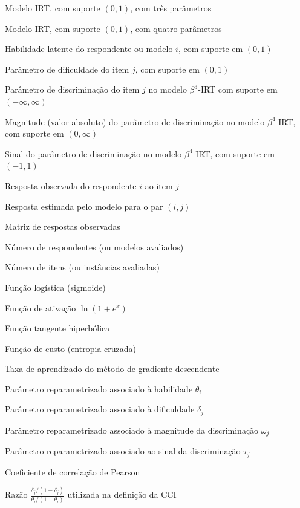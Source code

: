 \begin{simbolos}
  \item[$\beta^{3}$-IRT] Modelo IRT, com suporte $(0, 1)$, com três parâmetros
  \item[$\beta^{4}$-IRT] Modelo IRT, com suporte $(0, 1)$, com quatro parâmetros
  
  \item[$\theta_i$] Habilidade latente do respondente ou modelo $i$, com suporte em $(0,1)$
  \item[$\delta_j$] Parâmetro de dificuldade do item $j$, com suporte em $(0,1)$
  \item[$a_j$] Parâmetro de discriminação do item $j$ no modelo $\beta^3$-\gls{IRT} com suporte em $(-\infty, \infty)$
  \item[$\omega_j$] Magnitude (valor absoluto) do parâmetro de discriminação no modelo $\beta^4$-\gls{IRT}, com suporte em $(0,\infty)$
  \item[$\tau_j$] Sinal do parâmetro de discriminação no modelo $\beta^4$-\gls{IRT}, com suporte em $(-1,1)$
  \item[$p_{ij}$] Resposta observada do respondente $i$ ao item $j$
  \item[$\hat{p}_{ij}$] Resposta estimada pelo modelo para o par $(i,j)$
  \item[$\mathbf{P}$] Matriz de respostas observadas
  \item[$M$] Número de respondentes (ou modelos avaliados)
  \item[$N$] Número de itens (ou instâncias avaliadas)
  \item[$\sigma(\cdot)$] Função logística (sigmoide)
  \item[$\text{softplus}(\cdot)$] Função de ativação $\ln(1 + e^{x})$
  \item[$\tanh(\cdot)$] Função tangente hiperbólica
  \item[$H$] Função de custo (entropia cruzada)
  \item[$\eta$] Taxa de aprendizado do método de gradiente descendente
  \item[$t_i$] Parâmetro reparametrizado associado à habilidade $\theta_i$
  \item[$d_j$] Parâmetro reparametrizado associado à dificuldade $\delta_j$
  \item[$o_j$] Parâmetro reparametrizado associado à magnitude da discriminação $\omega_j$
  \item[$b_j$] Parâmetro reparametrizado associado ao sinal da discriminação $\tau_j$
  \item[$\rho(\cdot,\cdot)$] Coeficiente de correlação de Pearson
  \item[$\Phi(\theta_i,\delta_j)$] Razão $\frac{\delta_j/(1-\delta_j)}{\theta_i/(1-\theta_i)}$ utilizada na definição da CCI


\end{simbolos}
